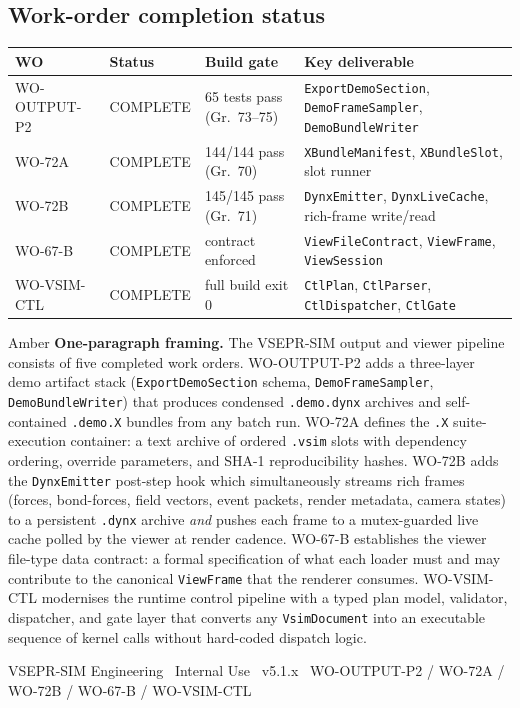 ﻿\documentclass[11pt,a4paper]{article}
\begin{document}
\subsection*{Work-order completion status}

\begin{center}
\begin{tabularx}{\linewidth}{@{}lllX@{}}
\toprule
\textbf{WO} & \textbf{Status} & \textbf{Build gate} & \textbf{Key deliverable} \\
\midrule
WO-OUTPUT-P2 & COMPLETE & 65 tests pass (Gr.\ 73--75) & \texttt{ExportDemoSection}, \texttt{DemoFrameSampler}, \texttt{DemoBundleWriter} \\
WO-72A       & COMPLETE & 144/144 pass (Gr.\ 70)      & \texttt{XBundleManifest}, \texttt{XBundleSlot}, slot runner \\
WO-72B       & COMPLETE & 145/145 pass (Gr.\ 71)      & \texttt{DynxEmitter}, \texttt{DynxLiveCache}, rich-frame write/read \\
WO-67-B      & COMPLETE & contract enforced            & \texttt{ViewFileContract}, \texttt{ViewFrame}, \texttt{ViewSession} \\
WO-VSIM-CTL  & COMPLETE & full build exit 0            & \texttt{CtlPlan}, \texttt{CtlParser}, \texttt{CtlDispatcher}, \texttt{CtlGate} \\
\bottomrule
\end{tabularx}
\end{center}

\vspace{8pt}

\begin{notebox}{Amber}
\textbf{One-paragraph framing.}\enspace
The VSEPR-SIM output and viewer pipeline consists of five completed work orders.
WO-OUTPUT-P2 adds a three-layer demo artifact stack
(\texttt{ExportDemoSection} schema, \texttt{DemoFrameSampler}, \texttt{DemoBundleWriter})
that produces condensed \texttt{.demo.dynx} archives and self-contained
\texttt{.demo.X} bundles from any batch run.
WO-72A defines the \texttt{.X} suite-execution container: a text archive of ordered
\texttt{.vsim} slots with dependency ordering, override parameters, and SHA-1
reproducibility hashes.
WO-72B adds the \texttt{DynxEmitter} post-step hook which simultaneously streams
rich frames (forces, bond-forces, field vectors, event packets, render metadata,
camera states) to a persistent \texttt{.dynx} archive \emph{and} pushes each frame
to a mutex-guarded live cache polled by the viewer at render cadence.
WO-67-B establishes the viewer file-type data contract: a formal specification of
what each loader must and may contribute to the canonical \texttt{ViewFrame} that the
renderer consumes.
WO-VSIM-CTL modernises the runtime control pipeline with a typed plan model,
validator, dispatcher, and gate layer that converts any \texttt{VsimDocument} into an
executable sequence of kernel calls without hard-coded dispatch logic.
\end{notebox}

\vfill
{\color{GrayMid}\footnotesize\centering
VSEPR-SIM Engineering \textbar\ Internal Use \textbar\ v5.1.x \textbar\ WO-OUTPUT-P2 / WO-72A / WO-72B / WO-67-B / WO-VSIM-CTL\par}
\end{document}
